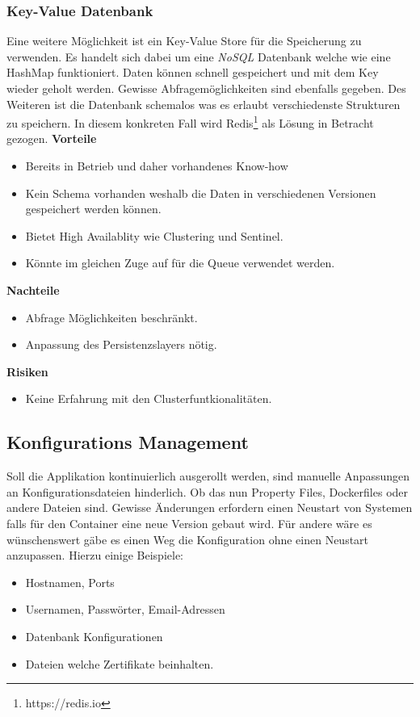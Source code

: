 \subsubsection{Key-Value Datenbank}

Eine weitere Möglichkeit ist ein Key-Value Store für die Speicherung zu verwenden. Es handelt sich dabei um eine \textit{\gls{NoSQL}} Datenbank welche wie eine HashMap funktioniert. Daten können schnell gespeichert und mit dem Key wieder geholt werden. Gewisse Abfragemöglichkeiten sind ebenfalls gegeben. Des Weiteren ist die Datenbank schemalos was es erlaubt verschiedenste Strukturen zu speichern. In diesem konkreten Fall wird Redis\footnote{https://redis.io} als Lösung in Betracht gezogen. \newline
\newline
\textbf{Vorteile}
\begin{itemize}
	\item Bereits in Betrieb und daher vorhandenes Know-how
	\item Kein Schema vorhanden weshalb die Daten in verschiedenen Versionen gespeichert werden können.
	\item Bietet High Availablity wie Clustering und Sentinel.
	\item Könnte im gleichen Zuge auf für die Queue verwendet werden.	
\end{itemize}
\textbf{Nachteile}
\begin{itemize}
	\item Abfrage Möglichkeiten beschränkt.
	\item Anpassung des Persistenzslayers nötig.
\end{itemize}
\textbf{Risiken}
\begin{itemize}
	\item Keine Erfahrung mit den Clusterfuntkionalitäten.
\end{itemize}

\subsection{Konfigurations Management}

Soll die Applikation kontinuierlich ausgerollt werden, sind manuelle Anpassungen an Konfigurationsdateien hinderlich. Ob das nun Property Files, Dockerfiles oder andere Dateien sind. Gewisse Änderungen erfordern einen Neustart von Systemen falls für den Container eine neue Version gebaut wird. Für andere wäre es wünschenswert gäbe es einen Weg die Konfiguration ohne einen Neustart anzupassen. Hierzu einige Beispiele:
\begin{itemize}
	\item Hostnamen, Ports
	\item Usernamen, Passwörter, Email-Adressen
	\item Datenbank Konfigurationen
	\item Dateien welche Zertifikate beinhalten.
\end{itemize}

